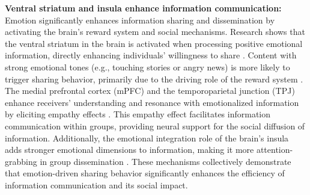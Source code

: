 
\textbf{Ventral striatum and insula enhance information communication:} Emotion significantly enhances information sharing and dissemination by activating the brain’s reward system and social mechanisms. Research shows that the ventral striatum in the brain is activated when processing positive emotional information, directly enhancing individuals’ willingness to share \cite{haber2010reward}. Content with strong emotional tones (e.g., touching stories or angry news) is more likely to trigger sharing behavior, primarily due to the driving role of the reward system \cite{van2012reward}. The medial prefrontal cortex (mPFC) and the temporoparietal junction (TPJ) enhance receivers’ understanding and resonance with emotionalized information by eliciting empathy effects \cite{decety2008emotion}. This empathy effect facilitates information communication within groups, providing neural support for the social diffusion of information. Additionally, the emotional integration role of the brain’s insula adds stronger emotional dimensions to information, making it more attention-grabbing in group dissemination \cite{craig2009you}. These mechanisms collectively demonstrate that emotion-driven sharing behavior significantly enhances the efficiency of information communication and its social impact.

